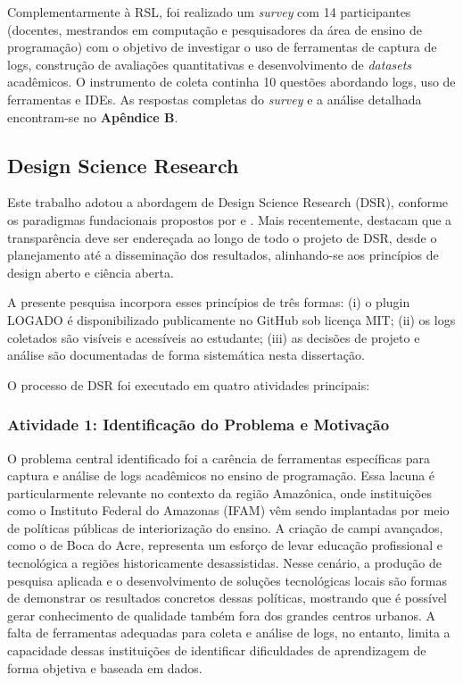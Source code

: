 Complementarmente à RSL, foi realizado um \textit{survey} com 14 participantes (docentes, mestrandos em computação e pesquisadores da área de ensino de programação) com o objetivo de investigar o uso de ferramentas de captura de logs, construção de avaliações quantitativas e desenvolvimento de \textit{datasets} acadêmicos. O instrumento de coleta continha 10 questões abordando logs, uso de ferramentas e IDEs. As respostas completas do \textit{survey} e a análise detalhada encontram-se no \textbf{Apêndice B}.

\subsection{Design Science Research}
\label{subsec:dsr}

Este trabalho adotou a abordagem de Design Science Research (DSR), conforme os paradigmas fundacionais propostos por \cite{hevner2004design} e \cite{peffers2007design}. Mais recentemente, \cite{hevner2024transparency} destacam que a transparência deve ser endereçada ao longo de todo o projeto de DSR, desde o planejamento até a disseminação dos resultados, alinhando-se aos princípios de design aberto e ciência aberta.

A presente pesquisa incorpora esses princípios de três formas: (i) o plugin LOGADO é disponibilizado publicamente no GitHub sob licença MIT; (ii) os logs coletados são visíveis e acessíveis ao estudante; (iii) as decisões de projeto e análise são documentadas de forma sistemática nesta dissertação.

O processo de DSR foi executado em quatro atividades principais:

\subsubsection{Atividade 1: Identificação do Problema e Motivação}

O problema central identificado foi a carência de ferramentas específicas para captura e análise de logs acadêmicos no ensino de programação. Essa lacuna é particularmente relevante no contexto da região Amazônica, onde instituições como o Instituto Federal do Amazonas (IFAM) vêm sendo implantadas por meio de políticas públicas de interiorização do ensino. A criação de campi avançados, como o de Boca do Acre, representa um esforço de levar educação profissional e tecnológica a regiões historicamente desassistidas. Nesse cenário, a produção de pesquisa aplicada e o desenvolvimento de soluções tecnológicas locais são formas de demonstrar os resultados concretos dessas políticas, mostrando que é possível gerar conhecimento de qualidade também fora dos grandes centros urbanos. A falta de ferramentas adequadas para coleta e análise de logs, no entanto, limita a capacidade dessas instituições de identificar dificuldades de aprendizagem de forma objetiva e baseada em dados.


